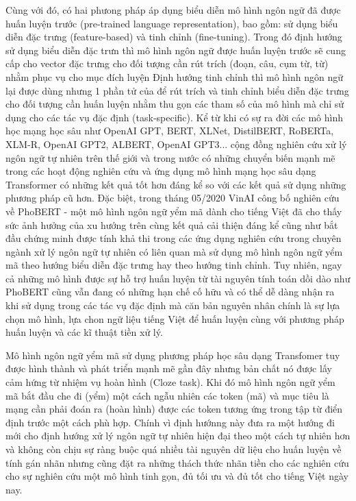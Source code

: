 \documentclass[10pt, conference, a4paper, compsocconf]{IEEEtran}
\begin{document}
Cùng với đó, có hai phưong pháp áp dụng biểu diễn mô hình ngôn ngữ đã được huấn luyện trước (pre-trained language representation), bao gồm:
sử dụng biểu diễn đặc trưng (feature-based) và tinh chỉnh (fine-tuning). 
Trong đó định hướng sử dụng biểu diễn đặc trưn thì mô hình ngôn ngữ được huấn luyện trước
sẽ cung cấp cho vector đặc trưng cho đối tượng cần rút trích (đoạn, câu, cụm từ, từ) nhằm phục vụ cho mục đích luyện
Định hướng tinh chỉnh thì mô hình ngôn ngữ lại được dùng nhưng 1 phần tử của để rút trích và tinh chỉnh biểu diễn đặc trưng cho đối tượng cần huấn luyện nhằm thu gọn các tham số của mô hình mà chỉ sử dụng cho các tác vụ đặc định (task-specific).
Kể từ khi có sự ra đời các mô hình học mạng học sâu như OpenAI GPT\cite{Radford2018}, BERT\cite{Devlin2018}, XLNet\cite{Yang2019}, DistilBERT\cite{Sanh2019}, RoBERTa\cite{Liu2019}, XLM-R\cite{Conneau2019}, OpenAI GPT2\cite{Radford2019}, 
ALBERT\cite{Lan2019}, OpenAI GPT3\cite{Brown2020}... 
cộng đồng nghiên cứu xử lý ngôn ngữ tự nhiên trên thế giới và trong nước có những chuyển biến mạnh mẽ trong các hoạt động nghiên cứu và ứng dụng mô hình mạng học sâu dạng Transformer 
có những kết quả tốt hơn đáng kể so với các kết quả sử dụng những phương pháp cũ hơn. 
Đặc biệt, trong tháng 05/2020 VinAI công bố nghiên cứu về PhoBERT\cite{Nguyen2020} - một mô hình ngôn ngữ yểm mã dành cho tiếng Việt đã cho thấy sức ảnh hưởng của xu hướng trên 
cùng kết quả cải thiện đáng kể cũng như bắt đầu chứng minh được tính khả thi trong các ứng dụng nghiên cứu trong chuyên ngành xử lý ngôn ngữ tự nhiên có liên quan mà sử dụng mô hình ngôn ngữ yểm mã theo hướng biểu diễn đặc trưng hay
theo hướng tinh chỉnh. Tuy nhiên, ngay cả những mô hình được sự hỗ trợ huấn luyện từ tài nguyên tính toán dồi dào như PhoBERT\cite{Nguyen2020} cũng vẫn đang có những hạn chế cố hữu và có thể dễ dàng nhận ra khi sử dụng trong các tác vụ đặc định mà căn bản nguyên nhân chính là sự lựa chọn mô hình,
lựa chon ngữ liệu tiếng Việt để huấn luyện cùng với phương pháp huấn luyện và các kĩ thuật tiền xử lý.

Mô hình ngôn ngữ yểm mã sử dụng phương pháp học sâu dạng Transfomer tuy được hình thành và phát triển mạnh mẽ gần đây nhưng bản chất nó 
được lấy cảm hứng từ nhiệm vụ hoàn hình\cite{Taylor1953} (Cloze task). Khi đó mô hình ngôn ngữ yểm mã bắt đầu che đi (yểm) một cách ngẫu nhiên các token (mã) và mục tiêu là mạng cần phải đoán ra (hoàn hình) được các token tương ứng trong tập từ điển định trước một cách phù hợp. 
Chính vì định hướnng này đưa ra một hướng đi mới cho định hướng xử lý ngôn ngữ tự nhiên hiện đại theo một cách tự nhiên hơn và không còn chịu sự ràng buộc quá nhiều tài nguyên dữ liệu cho huấn luyện về tính gán nhãn nhưng cũng đặt ra những thách thức nhãn tiền cho các nghiên cứu cho sự 
nghiên cứu một mô hình tinh gọn, đủ tối ưu và đủ tốt cho tiếng Việt ngày nay.
\end{document}
